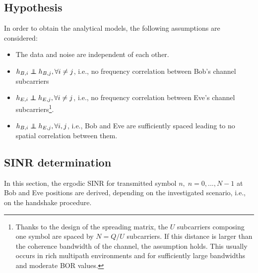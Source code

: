 \documentclass[journal,comsoc]{IEEEtran}
\newcommand\independent{\protect\mathpalette{\protect\independenT}{\perp}}
\def\independenT#1#2{\mathrel{\rlap{$#1#2$}\mkern2mu{#1#2}}}
\begin{document}

\subsection{Hypothesis}
In order to obtain the analytical models, the following assumptions are considered:
\begin{itemize}
	\item The data and noise are independent of each other. 
	\item $h_{B,i} \independent h_{B,j}, \forall i \neq j$, i.e., no frequency correlation between Bob's channel subcarriers
	\item $h_{E,i} \independent h_{E,j}, \forall i \neq j$, i.e., no frequency correlation between Eve's channel subcarriers\footnote{Thanks to the design of the spreading matrix, the $U$ subcarriers composing one symbol are spaced by $N = Q/U$ subcarriers. If this distance is larger than the coherence bandwidth of the channel, the assumption holds. This usually occurs in rich multipath environments and for sufficiently large bandwidths and moderate BOR values.}.
	\item $h_{B,i} \independent h_{E,j}, \forall i,j$, i.e., Bob and Eve are sufficiently spaced leading to no spatial correlation between them.
\end{itemize}


\subsection{SINR determination}
In this section, the ergodic SINR for transmitted symbol $n, \; n = 0,...,N-1$ at Bob and Eve positions are derived, depending on the investigated scenario, i.e., on the handshake procedure. 



\end{document}
